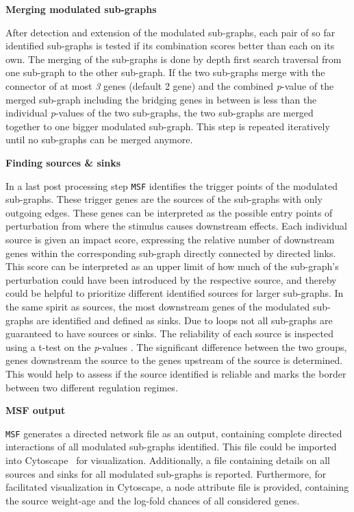 \documentclass[10pt,a4paper,twocolumn]{article}
\begin{document}
	\textbf{Merging modulated sub-graphs}

        After detection and extension of the modulated sub-graphs,
          each pair of so far identified sub-graphs is tested if its
          combination scores better than each on its own. The merging of
        the sub-graphs is done by depth first search traversal from
        one sub-graph to the other sub-graph. If the two sub-graphs
        merge with the connector of at most \emph{3} genes (default 2
        gene) and the combined \textit{p}-value of the merged
        sub-graph including the bridging genes in between is less than
        the individual \textit{p}-values of the two sub-graphs, the
        two sub-graphs are merged together to one bigger
        modulated sub-graph. This step is repeated iteratively until
        no sub-graphs can be merged
          anymore.\newline
	
	\textbf{Finding sources \& sinks}
	
	In a last post processing step \texttt{MSF} identifies the
        trigger points of the modulated sub-graphs. These trigger
        genes are the sources of the sub-graphs with only outgoing
        edges. These genes can be interpreted as the possible entry
        points of perturbation from where the stimulus causes
        downstream effects. Each individual source is given an impact
        score, expressing the relative number of downstream genes
          within the corresponding sub-graph directly connected by
          directed links. This score can be interpreted as an upper
          limit of how much of the sub-graph's perturbation could have
          been introduced by the respective source, and thereby could
          be helpful to prioritize different identified sources for
          larger sub-graphs. In the same
        spirit as sources, the most downstream genes of the
        modulated sub-graphs are identified and defined as sinks. Due
        to loops not all sub-graphs are guaranteed to have sources or
        sinks. The reliability of each source is inspected using a t-test on the \textit{p}-values . The significant difference between the two groups, genes downstream the source to the genes upstream of the source is determined. This would help to assess if the source identified is reliable and marks the border between two different regulation regimes.
	
	
	\textbf{MSF output}
	
	\texttt{MSF} generates a directed network file as an output,
        containing complete directed interactions of all modulated
        sub-graphs identified. This file could be imported into
        Cytoscape~\cite{Cyto} for visualization. Additionally, a
          file containing details on all sources and sinks for all
          modulated sub-graphs is reported. Furthermore, for
          facilitated visualization in Cytoscape, a node attribute
          file is provided, containing the source weight-age and the
          log-fold chances of all considered genes.
	
\end{document}
